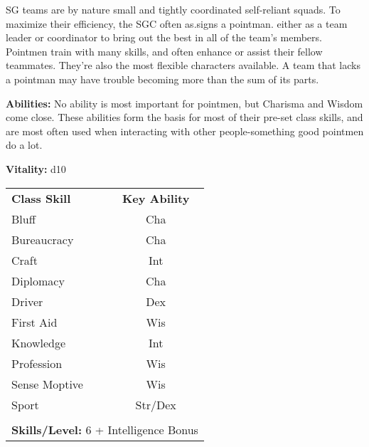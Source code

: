 \begin{multicols}{2}

SG teams are by nature small and tightly coordinated self-reliant squads. To maximize their efficiency, the SGC often as.signs a pointman. either as a team leader or coordinator to bring out the best in all of the team's members. Pointmen train with many skills, and often enhance or assist their fellow teammates. They're also the most flexible characters available. A team that lacks a pointman may have trouble becoming more than the sum of its parts.


\textbf{Abilities:} No ability is most important for pointmen, but Charisma and Wisdom come close. These abilities form the basis for most of their pre-set class skills, and are most often used when interacting with other people-something good pointmen do a lot.

\textbf{Vitality:} d10

\end{multicols}

\begin{table}[htb]
\raggedright
\begin{tabular}{l c}
\textbf{Class Skill} & \textbf{Key Ability}\\

Bluff & Cha\\
Bureaucracy & Cha\\
Craft & Int\\
Diplomacy & Cha\\
Driver & Dex\\
First Aid & Wis\\
Knowledge & Int\\
Profession & Wis\\
Sense Moptive & Wis\\
Sport & Str/Dex\\

\multicolumn{2}{l}{\cellcolor{white}}\\
\multicolumn{2}{l}{\cellcolor{white}\textbf{Skills/Level:} 6 + Intelligence Bonus}\\
\end{tabular}
\end{table}

\pagebreak

\modebab{}
\modefor{}
\moderef{}
\goodwil{}
\poordefb{}
\poorinit{}
\goodgear{}
\moderes{}

